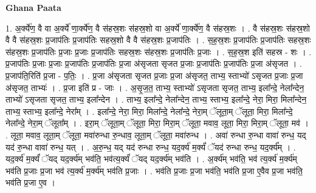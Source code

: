\documentclass[17pt]{extarticle}
\begin{document}
\textbf{Ghana Paata } \newline

1. अ॒र्क्ये॑ण॒ वै वा अ॒र्क्ये॑ णा॒र्क्ये॑ण॒ वै स॑हस्र॒शः स॑हस्र॒शो वा अ॒र्क्ये॑ णा॒र्क्ये॑ण॒ वै स॑हस्र॒शः । . वै स॑हस्र॒शः स॑हस्र॒शो वै वै स॑हस्र॒शः प्र॒जाप॑तिः प्र॒जाप॑तिः सहस्र॒शो वै वै स॑हस्र॒शः प्र॒जाप॑तिः । . स॒ह॒स्र॒शः प्र॒जाप॑तिः प्र॒जाप॑तिः सहस्र॒शः स॑हस्र॒शः प्र॒जाप॑तिः प्र॒जाः प्र॒जाः प्र॒जाप॑तिः सहस्र॒शः स॑हस्र॒शः प्र॒जाप॑तिः प्र॒जाः । . स॒ह॒स्र॒श इति॑ सहस्र - शः । . प्र॒जाप॑तिः प्र॒जाः प्र॒जाः प्र॒जाप॑तिः प्र॒जाप॑तिः प्र॒जा अ॑सृजता सृजत प्र॒जाः प्र॒जाप॑तिः प्र॒जाप॑तिः प्र॒जा अ॑सृजत । . प्र॒जाप॑ति॒रिति॑ प्र॒जा - प॒तिः॒ । . प्र॒जा अ॑सृजता सृजत प्र॒जाः प्र॒जा अ॑सृजत॒ ताभ्य॒ स्ताभ्यो॑ ऽसृजत प्र॒जाः प्र॒जा अ॑सृजत॒ ताभ्यः॑ । . प्र॒जा इति॑ प्र - जाः । . अ॒सृ॒ज॒त॒ ताभ्य॒ स्ताभ्यो॑ ऽसृजता सृजत॒ ताभ्य॒ इला᳚न्दे॒ नेला᳚न्देन॒ ताभ्यो॑ ऽसृजता सृजत॒ ताभ्य॒ इला᳚न्देन । . ताभ्य॒ इला᳚न्दे॒ नेला᳚न्देन॒ ताभ्य॒ स्ताभ्य॒ इला᳚न्दे॒ नेरा॒ मिरा॒ मिला᳚न्देन॒ ताभ्य॒ स्ताभ्य॒ इला᳚न्दे॒ नेरा᳚म् । . इला᳚न्दे॒ नेरा॒ मिरा॒ मिला᳚न्दे॒ नेला᳚न्दे॒ नेरा॒म् ॅलूता॒म् ॅलूता॒ मिरा॒ मिला᳚न्दे॒ नेला᳚न्दे॒ नेरा॒म् ॅलूता᳚म् । . इरा॒म् ॅलूता॒म् ॅलूता॒ मिरा॒ मिरा॒म् ॅलूता॒ मवाव॒ लूता॒ मिरा॒ मिरा॒म् ॅलूता॒ मव॑ । . लूता॒ मवाव॒ लूता॒म् ॅलूता॒ मवा॑रुन्धा रु॒न्धाव॒ लूता॒म् ॅलूता॒ मवा॑रुन्ध । . अवा॑ रुन्धा रु॒न्धा वावा॑ रुन्ध॒ यद् यद॑ रु॒न्धा वावा॑ रुन्ध॒ यत् । . अ॒रु॒न्ध॒ यद् यद॑ रुन्धा रुन्ध॒ यद॒र्क्य॑ म॒र्क्यं॑ ॅयद॑ रुन्धा रुन्ध॒ यद॒र्क्य᳚म् । . यद॒र्क्य॑ म॒र्क्यं॑ ॅयद् यद॒र्क्य॑म् भव॑ति॒ भव॑त्य॒र्क्यं॑ ॅयद् यद॒र्क्य॑म् भव॑ति । . अ॒र्क्य॑म् भव॑ति॒ भव॑ त्य॒र्क्य॑ म॒र्क्य॑म् भव॑ति प्र॒जाः प्र॒जा भव॑ त्य॒र्क्य॑ म॒र्क्य॑म् भव॑ति प्र॒जाः । . भव॑ति प्र॒जाः प्र॒जा भव॑ति॒ भव॑ति प्र॒जा ए॒वैव प्र॒जा भव॑ति॒ भव॑ति प्र॒जा ए॒व । \newline
\end{document}
